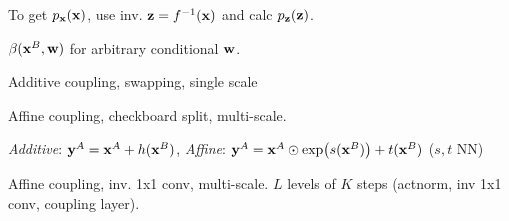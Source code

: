 \begin{definition}[Inference]
    To get \(p_{\vb{x}}(\vb{x})\), use inv. \(\vb{z} = f^{-1}(\vb{x})\) and calc \(p_{\vb{z}}(\vb{z})\).
\end{definition}


\begin{definition}
    \(\beta(\vb{x}^B, \vb{w})\) for arbitrary conditional \(\vb{w}\).
\end{definition}

\begin{definition}[NICE]
    Additive coupling, swapping, single scale
\end{definition}

\begin{definition}[RealNVP]
    Affine coupling, checkboard split, multi-scale.

    \textit{Additive}: \(\vb{y}^A = \vb{x}^A + h(\vb{x}^B)\), \textit{Affine}: \(\vb{y}^A = \vb{x}^A \odot \exp(s(\vb{x}^B)) + t(\vb{x}^B)\) (\(s, t\) NN)
\end{definition}

\begin{definition}[GLOW]
    Affine coupling, inv. 1x1 conv, multi-scale. \(L\) levels of \(K\) steps (actnorm, inv 1x1 conv, coupling layer).
\end{definition}

